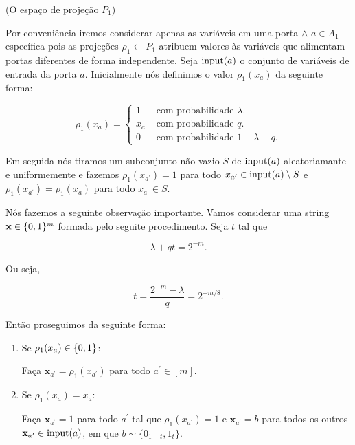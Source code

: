 \begin{defi} (O espaço de projeção $P_{1}$) \label{defi_P1}

Por conveniência iremos considerar apenas as variáveis em uma porta $\land$ $a \in A_{1}$ específica pois as projeções $\rho_{1} \leftarrow P_{1}$ atribuem valores às variáveis que alimentam portas diferentes de forma independente. Seja $\text{input}(a)$ o conjunto de variáveis de entrada da porta $a$. Inicialmente nós definimos o valor $\rho_{1}(x_{a})$ da seguinte forma:

\begin{equation} \label{defi_P1_eqn}
	\rho_{1}(x_{a}) = \begin{cases}
				1 & \text{ com probabilidade } \lambda. \\
				x_{a} & \text{ com probabilidade } q. \\
				0 & \text{ com probabilidade } 1 - \lambda - q.
			  \end{cases}
\end{equation}

Em seguida nós tiramos um subconjunto não vazio $S$ de $\text{input}(a)$ aleatoriamante e uniformemente e fazemos $\rho_{1}(x_{a^{\prime}}) = 1$ para todo $x_{a^{\prime}} \in \text{input}(a) \setminus S$ e $\rho_{1}(x_{a^{\prime}}) = \rho_{1}(x_{a})$ para todo $x_{a^{\prime}} \in S$.

\end{defi}

Nós fazemos a seguinte observação importante. Vamos considerar uma string $\textbf{x} \in \{0, 1\}^{m}$ formada pelo seguite procedimento. Seja $t$ tal que

\begin{equation} \label{t_defi_1}
	\lambda + qt = 2^{-m}.
\end{equation}

Ou seja,

\begin{equation} \label{t_defi_2}
	t = \frac{2^{-m} - \lambda}{q} = 2^{-m/8}.
\end{equation}

Então proseguimos da seguinte forma:

\begin{enumerate}

\item Se $\rho_{1}(x_{a}) \in \{0, 1\}$:

Faça $\textbf{x}_{a^{\prime}} = \rho_{1}(x_{a^{\prime}})$ para todo $a^{\prime} \in [m]$.

\item Se $\rho_{1}(x_{a}) = x_{a}$:

Faça $\textbf{x}_{a^{\prime}} = 1$ para todo $a^{\prime}$ tal que $\rho_{1}(x_{a^{\prime}}) = 1$ e $\textbf{x}_{a^{\prime}} = b$ para todos os outros $\textbf{x}_{a^{\prime}} \in \text{input}(a)$, em que $b \sim \{0_{1 - t}, 1_{t}\}$.

\end{enumerate}

